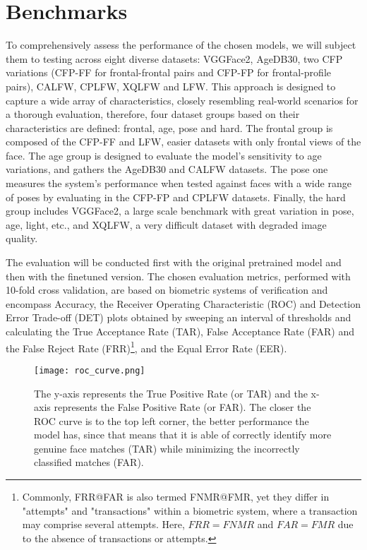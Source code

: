 \documentclass[class=report, crop=false, a4paper, 12pt]{standalone}
\begin{document}
\section{Benchmarks}
To comprehensively assess the performance of the chosen models, we will subject them to testing across eight diverse datasets: VGGFace2, AgeDB30, two CFP variations (CFP-FF for frontal-frontal pairs and CFP-FP for frontal-profile pairs), CALFW, CPLFW, XQLFW and LFW. This approach is designed to capture a wide array of characteristics, closely resembling real-world scenarios for a thorough evaluation, therefore, four dataset groups based on their characteristics are defined: frontal, age, pose and hard. The frontal group is composed of the CFP-FF and LFW, easier datasets with only frontal views of the face. The age group is designed to evaluate the model's sensitivity to age variations, and gathers the AgeDB30 and CALFW datasets. The pose one measures the system's performance when tested against faces with a wide range of poses by evaluating in the CFP-FP and CPLFW datasets. Finally, the hard group includes VGGFace2, a large scale benchmark with great variation in pose, age, light, etc., and XQLFW, a very difficult dataset with degraded image quality.  
\par The evaluation will be conducted first with the original pretrained model and then with the finetuned version. The chosen evaluation metrics, performed with 10-fold cross validation, are based on biometric systems of verification and encompass Accuracy, the Receiver Operating Characteristic (ROC) and Detection Error Trade-off (DET) plots obtained by sweeping an interval of thresholds and calculating the True Acceptance Rate (TAR), False Acceptance Rate (FAR) and the False Reject Rate (FRR)\footnote{Commonly, FRR@FAR is also termed FNMR@FMR, yet they differ in "attempts" and "transactions" within a biometric system, where a transaction may comprise several attempts. Here, $FRR=FNMR$ and $FAR=FMR$ due to the absence of transactions or attempts.}, and the Equal Error Rate (EER).

\begin{figure}[!h]
  \centering
  \texttt{[image: roc\_curve.png]}
  \caption{The y-axis represents the True Positive Rate (or TAR) and the x-axis represents the False Positive Rate (or FAR). The closer the ROC curve is to the top left corner, the better performance the model has, since that means that it is able of correctly identify more genuine face matches (TAR) while minimizing the incorrectly classified matches (FAR).}
  \label{fig:roc_curve}
\end{figure}
\end{document}
